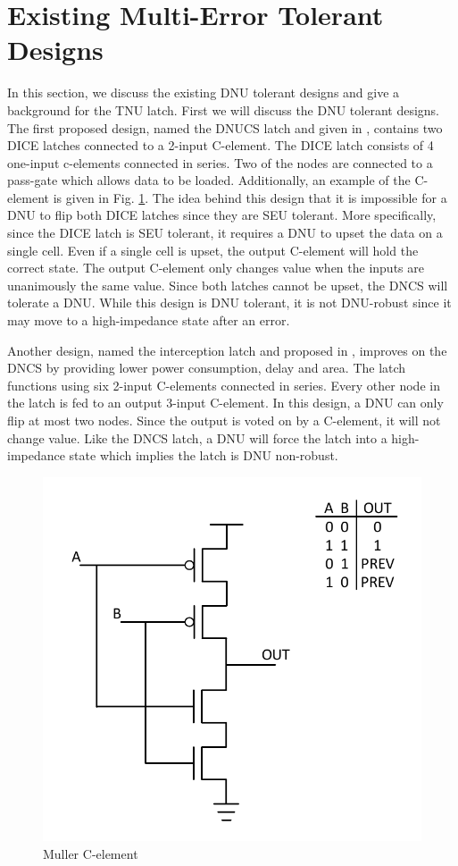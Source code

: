 \section{Existing Multi-Error Tolerant Designs} \label{sec:DNUdes}

In this section, we discuss the existing DNU tolerant designs and give a background for the TNU latch. First we will discuss the DNU tolerant designs. The first proposed design, named the DNUCS latch and given in \cite{DNCS}, contains two DICE latches connected to a 2-input C-element. The DICE latch consists of 4 one-input c-elements connected in series. Two of the nodes are connected to a pass-gate which allows data to be loaded. Additionally, an example of the C-element is given in Fig. \ref{Cele_fig}. The idea behind this design that it is impossible for a DNU to flip both DICE latches since they are SEU tolerant. More specifically, since the DICE latch is SEU tolerant, it requires a DNU to upset the data on a single cell. Even if a single cell is upset, the output C-element will hold the correct state. The output C-element only changes value when the inputs are unanimously the same value. Since both latches cannot be upset, the DNCS will tolerate a DNU. While this design is DNU tolerant, it is not DNU-robust since it may move to a high-impedance state after an error. 

Another design, named the interception latch and proposed in \cite{Inter}, improves on the DNCS by providing lower power consumption, delay and area. The latch functions using six 2-input C-elements connected in series. Every other node in the latch is fed to an output 3-input C-element. In this design, a DNU can only flip at most two nodes. Since the output is voted on by a C-element, it will not change value. Like the DNCS latch, a DNU will force the latch into a high-impedance state which implies the latch is DNU non-robust.

\begin{figure}[!htbp]
	\centering
	\includegraphics[width=0.75\linewidth]{Figures/C_ele}
	\caption{Muller C-element}
	\label{Cele_fig}
\end{figure}

